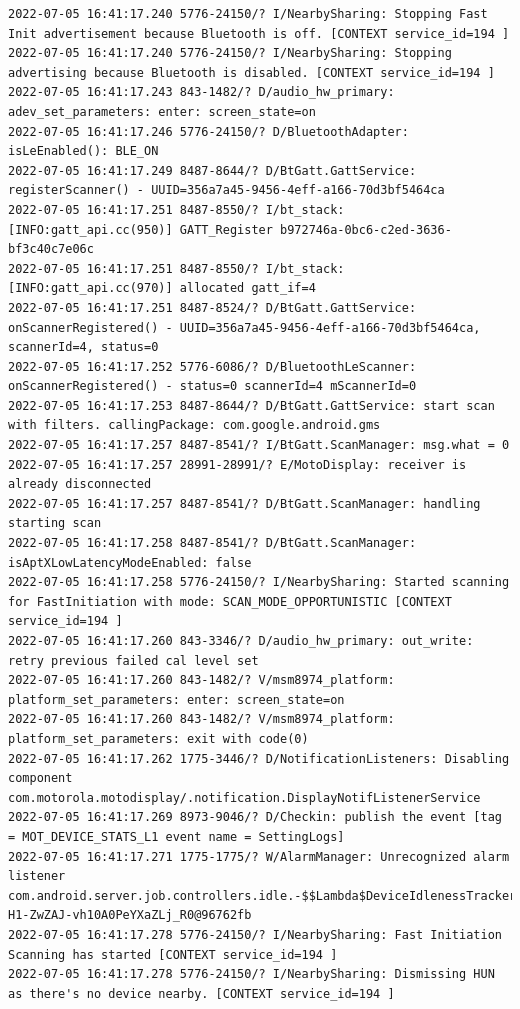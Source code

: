 \documentclass[a4paper,12pt]{book}
\begin{document}
\begin{lstlisting}
2022-07-05 16:41:17.240 5776-24150/? I/NearbySharing: Stopping Fast Init advertisement because Bluetooth is off. [CONTEXT service_id=194 ]
2022-07-05 16:41:17.240 5776-24150/? I/NearbySharing: Stopping advertising because Bluetooth is disabled. [CONTEXT service_id=194 ]
2022-07-05 16:41:17.243 843-1482/? D/audio_hw_primary: adev_set_parameters: enter: screen_state=on
2022-07-05 16:41:17.246 5776-24150/? D/BluetoothAdapter: isLeEnabled(): BLE_ON
2022-07-05 16:41:17.249 8487-8644/? D/BtGatt.GattService: registerScanner() - UUID=356a7a45-9456-4eff-a166-70d3bf5464ca
2022-07-05 16:41:17.251 8487-8550/? I/bt_stack: [INFO:gatt_api.cc(950)] GATT_Register b972746a-0bc6-c2ed-3636-bf3c40c7e06c
2022-07-05 16:41:17.251 8487-8550/? I/bt_stack: [INFO:gatt_api.cc(970)] allocated gatt_if=4
2022-07-05 16:41:17.251 8487-8524/? D/BtGatt.GattService: onScannerRegistered() - UUID=356a7a45-9456-4eff-a166-70d3bf5464ca, scannerId=4, status=0
2022-07-05 16:41:17.252 5776-6086/? D/BluetoothLeScanner: onScannerRegistered() - status=0 scannerId=4 mScannerId=0
2022-07-05 16:41:17.253 8487-8644/? D/BtGatt.GattService: start scan with filters. callingPackage: com.google.android.gms
2022-07-05 16:41:17.257 8487-8541/? I/BtGatt.ScanManager: msg.what = 0
2022-07-05 16:41:17.257 28991-28991/? E/MotoDisplay: receiver is already disconnected
2022-07-05 16:41:17.257 8487-8541/? D/BtGatt.ScanManager: handling starting scan
2022-07-05 16:41:17.258 8487-8541/? D/BtGatt.ScanManager: isAptXLowLatencyModeEnabled: false
2022-07-05 16:41:17.258 5776-24150/? I/NearbySharing: Started scanning for FastInitiation with mode: SCAN_MODE_OPPORTUNISTIC [CONTEXT service_id=194 ]
2022-07-05 16:41:17.260 843-3346/? D/audio_hw_primary: out_write: retry previous failed cal level set
2022-07-05 16:41:17.260 843-1482/? V/msm8974_platform: platform_set_parameters: enter: screen_state=on
2022-07-05 16:41:17.260 843-1482/? V/msm8974_platform: platform_set_parameters: exit with code(0)
2022-07-05 16:41:17.262 1775-3446/? D/NotificationListeners: Disabling component com.motorola.motodisplay/.notification.DisplayNotifListenerService
2022-07-05 16:41:17.269 8973-9046/? D/Checkin: publish the event [tag = MOT_DEVICE_STATS_L1 event name = SettingLogs]
2022-07-05 16:41:17.271 1775-1775/? W/AlarmManager: Unrecognized alarm listener com.android.server.job.controllers.idle.-$$Lambda$DeviceIdlenessTracker$-H1-ZwZAJ-vh10A0PeYXaZLj_R0@96762fb
2022-07-05 16:41:17.278 5776-24150/? I/NearbySharing: Fast Initiation Scanning has started [CONTEXT service_id=194 ]
2022-07-05 16:41:17.278 5776-24150/? I/NearbySharing: Dismissing HUN as there's no device nearby. [CONTEXT service_id=194 ]

\end{lstlisting}
\end{document}
